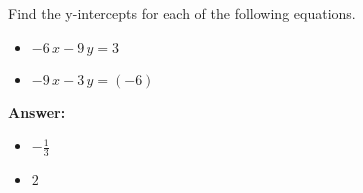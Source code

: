  Find the y-intercepts for each of the following equations. \begin{itemize}\item \( -6 \, x - 9 \, y = 3 \)\item \( -9 \, x - 3 \, y = \left(-6\right) \)\end{itemize}

        \textbf{Answer:} \begin{itemize}\item \( -\frac{1}{3} \)\item \( 2 \)\end{itemize}
